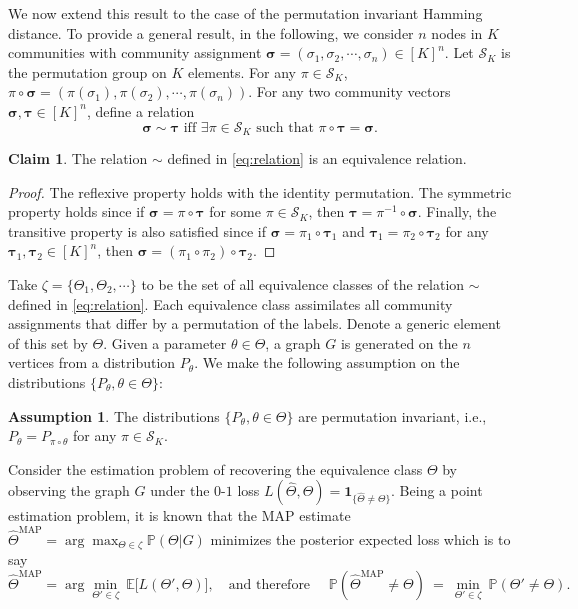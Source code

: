 \documentclass[letterpaper,11pt]{article}
\newtheorem{claim}[thm]{Claim}
\theoremstyle{definition}
\newtheorem{assumption}{Assumption}[section]
\def\1{\mathbf{1}}
\def\E{\mathbb{E}}
\def\P{\mathbb{P}}
\newcommand{\bsigma}{\bm{\sigma}}
\newcommand{\btau}{\bm{\tau}}
\newcommand{\Tmap}{\hat{\Theta}^{\text{MAP}}}
\def\cS{\mathcal{S}}
\def\weq{ \ = \ }
\numberwithin{equation}{section}
\newtheorem{claim}[thm]{Claim}
\theoremstyle{definition}
\newtheorem{assumption}{Assumption}[section]
\def\1{\mathbf{1}}
\def\E{\mathbb{E}}
\def\P{\mathbb{P}}
\newcommand{\bsigma}{\bm{\sigma}}
\newcommand{\btau}{\bm{\tau}}
\newcommand{\Tmap}{\hat{\Theta}^{\text{MAP}}}
\def\cS{\mathcal{S}}
\def\weq{ \ = \ }
\numberwithin{equation}{section}
\theoremstyle{thmstyletwo}%
\begin{document}
\begin{appendices}
We now extend this result to the case of the permutation invariant Hamming distance.
To provide a general result, in the following, we consider $n$ nodes in $K$ communities with community assignment $\bsigma = (\sigma_1,\sigma_2,\cdots,\sigma_n) \in [K]^n$. Let $\cS_K$ is the permutation group on $K$ elements. For any $\pi \in \cS_K$, $\pi \circ \bsigma = (\pi(\sigma_1),\pi(\sigma_2),\cdots,\pi(\sigma_n))$. For any two community vectors $\bsigma, \btau \in [K]^n$, define a relation
\begin{equation}
    \label{eq:relation}
    \bsigma \sim \btau \text{ iff } \exists \pi \in \cS_K \text{ such that } \pi\circ \btau = \bsigma.
\end{equation}
\begin{claim}
    The relation $\sim$ defined in \eqref{eq:relation} is an equivalence relation.
\end{claim}
\begin{proof}
    The reflexive property holds with the identity permutation. The symmetric property holds since if $\bsigma = \pi \circ \btau$ for some $\pi \in \cS_K$, then $\btau = \pi^{-1} \circ \bsigma$. Finally, the transitive property is also satisfied since if $\bsigma = \pi_1 \circ \btau_1$ and $\btau_1 = \pi_2 \circ \btau_2$ for any $\btau_1,\btau_2 \in [K]^n$, then $\bsigma = (\pi_1\circ \pi_2)\circ \btau_2$.
\end{proof}
Take $\zeta = \{\Theta_1,\Theta_2,\cdots\}$ to be the set of all equivalence classes of the relation $\sim$ defined in \eqref{eq:relation}. Each equivalence class assimilates all community assignments that differ by a permutation of the labels. Denote a generic element of this set by $\Theta$. Given a parameter $\theta \in \Theta$, a graph $G$ is generated on the $n$ vertices from a distribution $P_\theta$. We make the following assumption on the distributions $\{P_\theta,\theta \in \Theta\}$:
\begin{assumption}
    The distributions $\{P_\theta,\theta \in \Theta\}$ are permutation invariant, i.e., $P_\theta = P_{\pi \circ \theta}$ for any $\pi \in \cS_K$.
    \label{ass:prob_perm_invariant}
\end{assumption}
Consider the estimation problem of recovering the equivalence class $\Theta$ by observing the graph $G$ under the $0$-$1$ loss $L(\hat{\Theta},\Theta) = \1_{\{\hat{\Theta} \neq \Theta\}}$. Being a point estimation problem, it is known that the MAP estimate $\Tmap = \arg \max_{\Theta \in \zeta} \P(\Theta | G)$ minimizes the posterior expected loss which is to say
\[
\Tmap = \arg\min_{\Theta' \in \zeta}\ \E\big[L(\Theta', \Theta)\big], \quad \text{and therefore }\quad \P(\Tmap \neq \Theta) \weq  \min_{\Theta' \in \zeta}\ \P(\Theta'\neq \Theta).
\]
\end{appendices}
\end{document}
